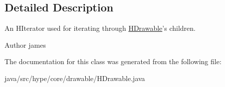 \subsection{Detailed Description}
An H\-Iterator used for iterating through \hyperlink{classhype_1_1core_1_1drawable_1_1_h_drawable}{H\-Drawable}'s children. 

\begin{DoxyAuthor}{Author}
james 
\end{DoxyAuthor}


The documentation for this class was generated from the following file\-:\begin{DoxyCompactItemize}
\item 
java/src/hype/core/drawable/H\-Drawable.\-java\end{DoxyCompactItemize}
